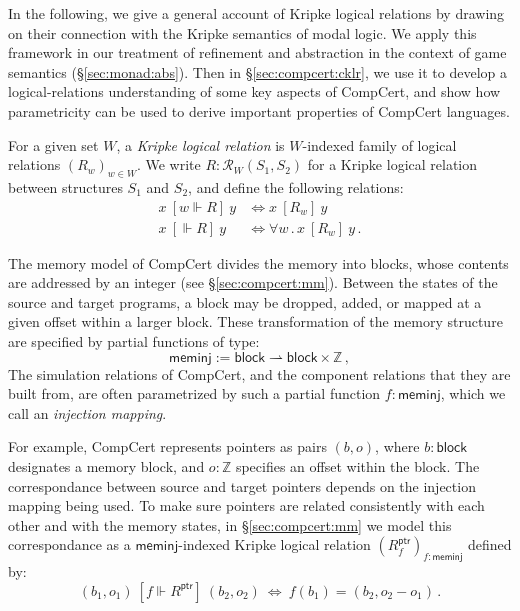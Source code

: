 \documentclass[acmsmall,timestamp,review,anonymous]{acmart}
\newcommand{\kw}[1]{\ensuremath{ \mathsf{#1} }}
\newcommand{\ifr}[1]{\ [{#1}]\ }
\begin{document}
In the following,
we give a general account of Kripke logical relations
by drawing on their connection with
the Kripke semantics of modal logic.
We apply this framework
in our treatment of refinement and abstraction
in the context of game semantics (\S\ref{sec:monad:abs}).
Then in \S\ref{sec:compcert:cklr},
we use it to develop a logical-relations
understanding of some key aspects of CompCert,
and show how parametricity
can be used to derive important properties
of CompCert languages.

\begin{definition}
For a given set $W$,
a \emph{Kripke logical relation} is
$W$-indexed family of logical relations $(R_w)_{w \in W}$.
We write $R : \mathcal{R}_W(S_1, S_2)$
for a Kripke logical relation between structures $S_1$ and $S_2$,
and define the following relations:
\begin{align*}
  x \ifr{w \Vdash R} y &\Leftrightarrow x \ifr{R_w} y \\
  x \ifr{\Vdash R} y &\Leftrightarrow \forall w \,.\, x \ifr{R_w} y \,.
\end{align*}
\end{definition}

\begin{example} \label{ex:meminj} %
The memory model of CompCert divides the memory into blocks,
whose contents are addressed by an integer
(see \S\ref{sec:compcert:mm}).
Between the states of the source and target programs,
a block may be dropped, added, or
mapped at a given offset within a larger block.
These transformation of the memory structure
are specified by partial functions of type:
\[
  \kw{meminj} := \kw{block} \rightharpoonup \kw{block} \times \mathbb{Z} \,,
\]
The simulation relations of CompCert,
and the component relations that they are built from,
are often parametrized by such a partial function $f : \kw{meminj}$,
which we call an \emph{injection mapping}.

For example,
CompCert represents pointers as pairs $(b, o)$, where
$b : \kw{block}$ designates a memory block, and
$o : \mathbb{Z}$ specifies an offset within the block.
The correspondance between source and target pointers
depends on the injection mapping being used.
To make sure pointers are related consistently
with each other and with the memory states,
in \S\ref{sec:compcert:mm}
we model this correspondance as a $\kw{meminj}$-indexed
Kripke logical relation $(R^\kw{ptr}_f)_{f : \kw{meminj}}$
defined by:
\[
    (b_1, o_1) \ifr{f \Vdash R^\kw{ptr}} (b_2, o_2) \:\Leftrightarrow\:
    f(b_1) = (b_2, o_2 - o_1) \,.
\]
\end{example}
\end{document}
